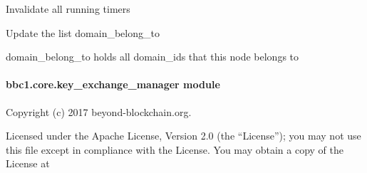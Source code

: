 \documentclass[letterpaper,10pt,english]{sphinxmanual}
\begin{document}
\begin{fulllineitems}
\begin{fulllineitems}
\begin{quote}
\begin{description}
\end{description}\end{quote}

\end{fulllineitems}


\begin{fulllineitems}
\label{\detokenize{bbc1.core.domain0_manager:bbc1.core.domain0_manager.Domain0Manager.stop_all_timers}}
Invalidate all running timers

\end{fulllineitems}


\begin{fulllineitems}
\label{\detokenize{bbc1.core.domain0_manager:bbc1.core.domain0_manager.Domain0Manager.update_domain_belong_to}}
Update the list domain\_belong\_to

domain\_belong\_to holds all domain\_ids that this node belongs to

\end{fulllineitems}


\end{fulllineitems}



\paragraph{bbc1.core.key\_exchange\_manager module}
\label{\detokenize{bbc1.core.key_exchange_manager:bbc1-core-key-exchange-manager-module}}\label{\detokenize{bbc1.core.key_exchange_manager::doc}}\label{\detokenize{bbc1.core.key_exchange_manager:module-bbc1.core.key_exchange_manager}}
Copyright (c) 2017 beyond-blockchain.org.

Licensed under the Apache License, Version 2.0 (the “License”);
you may not use this file except in compliance with the License.
You may obtain a copy of the License at
\begin{quote}

\end{quote}
\end{document}
